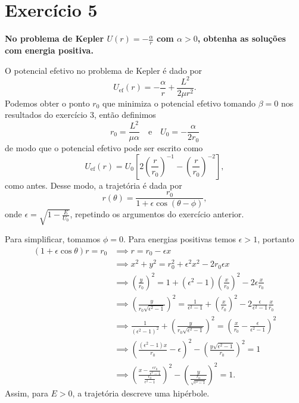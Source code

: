 \section*{Exercício 5}
\textbf{No problema de Kepler \(U(r) = -\frac{\alpha}{r}\) com \(\alpha > 0\), obtenha as soluções com energia positiva.}

O potencial efetivo no problema de Kepler é dado por
\begin{equation*}
    U_\mathrm{ef}(r) = -\frac{\alpha}{r} + \frac{L^2}{2\mu r^2}.
\end{equation*}
Podemos obter o ponto \(r_0\) que minimiza o potencial efetivo tomando \(\beta = 0\) nos resultados do exercício 3, então definimos
\begin{equation*}
    r_0 = \frac{L^2}{\mu \alpha}\quad\text{e}\quad U_0 = -\frac{\alpha}{2r_0}
\end{equation*}
de modo que o potencial efetivo pode ser escrito como
\begin{equation*}
    U_\mathrm{ef}(r) = U_0\left[2\left(\frac{r}{r_0}\right)^{-1} - \left(\frac{r}{r_0}\right)^{-2}\right],
\end{equation*}
como antes. Desse modo, a trajetória é dada por
\begin{equation*}
    r(\theta) = \frac{r_0}{1 + \epsilon \cos\left(\theta - \phi\right)},
\end{equation*}
onde \(\epsilon = \sqrt{1 - \frac{E}{U_0}}\), repetindo os argumentos do exercício anterior.

Para simplificar, tomamos \(\phi = 0\). Para energias positivas temos \(\epsilon > 1\), portanto
\begin{align*}
    (1+\epsilon\cos\theta)r = r_0 &\implies r = r_0 - \epsilon x\\
                                  &\implies x^2 + y^2 = r_0^2 + \epsilon^2 x^2 - 2 r_0 \epsilon x\\
                                  &\implies \left(\frac{y}{r_0}\right)^2 = 1 + (\epsilon^2 - 1)\left(\frac{x}{r_0}\right)^2 - 2 \epsilon\frac{x}{r_0}\\
                                  &\implies \left(\frac{y}{r_0\sqrt{\epsilon^2 - 1}}\right)^2 = \frac{1}{\epsilon^2 - 1} + \left(\frac{x}{r_0}\right)^2 - 2\frac{\epsilon}{\epsilon^2 - 1}\frac{x}{r_0}\\
                                  &\implies \frac{1}{(\epsilon^2 - 1)^2} + \left(\frac{y}{r_0\sqrt{\epsilon^2 - 1}}\right)^2 = \left(\frac{x}{r_0} - \frac{\epsilon}{\epsilon^2 - 1}\right)^2\\
                                  &\implies \left(\frac{\left(\epsilon^2 - 1\right)x}{r_0} - \epsilon\right)^2 - \left(\frac{y\sqrt{\epsilon^2 - 1}}{r_0}\right)^2 = 1\\
                                  &\implies \left(\frac{x - \frac{\epsilon r_0}{\epsilon^2 - 1}}{\frac{r_0}{\epsilon^2 - 1}}\right)^2 - \left(\frac{y}{\frac{r_0}{\sqrt{\epsilon^2 - 1}}}\right)^2 = 1.
\end{align*}
Assim, para \(E > 0\), a trajetória descreve uma hipérbole.
